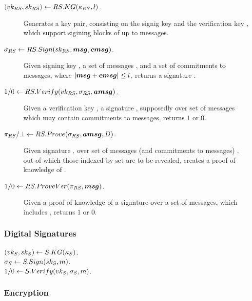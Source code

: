\begin{description}
\item[$(vk_{RS},sk_{RS}) \gets RS.KG(\kappa_{RS},l)$.] Generates a key pair,
  consisting on the signig key \RSsk and the verification key \RSvk, which
  support sigining blocks of up to \RSlen messages.
\item[$\sigma_{RS} \gets RS.Sign(sk_{RS},\boldsymbol{msg},\boldsymbol{cmsg})$.] Given signing key \RSsk,
  a set of messages \msgset, and a set of commitments to messages, where
  $|\boldsymbol{msg} + \boldsymbol{cmsg}| \le l$, returns a signature \RSsig.
\item[$1/0 \gets RS.Verify(vk_{RS},\sigma_{RS},\boldsymbol{amsg})$.] Given a verification key
  \RSvk, a signature \RSsig, supposedly over set of messages \amsgset which may
  contain commitments to messages, returns $1$ or $0$. 
\item[$\pi_{RS}/\bot \gets RS.Prove(\sigma_{RS},\boldsymbol{amsg},D)$.] Given signature
  \RSsig, over set of messages (and commitments to messages) \amsgset, out of
  which those indexed by set \D are to be revealed, creates a proof of knowledge
  \RSproof of \RSsig.
\item[$1/0 \gets RS.ProveVer(\pi_{RS},\boldsymbol{msg})$.] Given a proof of knowledge of
  a signature over a set of messages, which includes \msgset, returns $1$ or
  $0$.
\end{description}


\subsubsection{Digital Signatures}


\begin{description}
\item[$(vk_{S},sk_{S}) \gets S.KG(\kappa_{S})$.]
\item[$\sigma_{S} \gets S.Sign(sk_{S},m)$.]
\item[$1/0 \gets S.Verify(vk_{S},\sigma_{S},m)$.]  
\end{description}

\subsubsection{Encryption}


